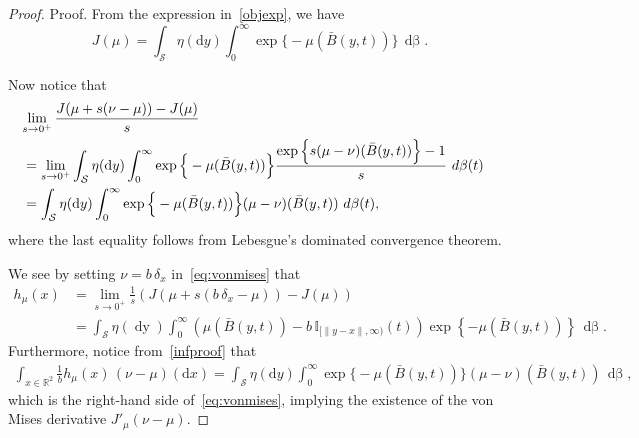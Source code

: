\documentclass[stsy,sglanonrev]{informs4}
\newcommand{\death}{{\beta}}
\begin{document}
\begin{proof}{Proof.}
From the expression in~\eqref{objexp}, we have \begin{equation}\label{objexp2}
    J(\mu) = \int_{\mathcal{S}} \eta(\mbox{d}y) \int_0^\infty \exp\Big\{-\mu(\bar{B}(y,t))\Big\} \, \mathop{d\death(t)}.
\end{equation}

Now notice that
\begin{align}\label{eq:vonmises}
    \lefteqn{\lim_{s \to 0^+} \frac{J(\mu + s(\nu - \mu)) - J(\mu)}{s}} \nonumber \\
    & = \lim_{s \to 0^+} \int_{\mathcal{S}} \eta(\mbox{d}y) \int_0^\infty \exp \Big\{-\mu(\bar{B}(y,t))\Big\} \frac{\exp\Big\{ s(\mu - \nu)(\bar{B}(y,t))\Big\}-1}{s} \, \mathop{d\death(t)} \nonumber \\ 
& = \int_{\mathcal{S}} \eta(\mbox{d}y) \int_0^\infty \exp\Big\{-\mu(\bar{B}(y,t))\Big\} (\mu - \nu)(\bar{B}(y,t)) \, \mathop{d\death(t)},\end{align} where the last equality follows from Lebesgue's dominated convergence theorem. 

We see by setting $\nu = b\,\delta_x$ in~\eqref{eq:vonmises} that
\begin{align} \label{infproof}
h_{\mu}(x) &= \lim_{s \to 0^+} \frac{1}{s} (J(\mu + s(b\,\delta_x - \mu)) - J(\mu)) \nonumber \\
&=  \int_{\mathcal{S}} \eta(\mathop{dy}) \int_0^{\infty} \left(\mu\left(\bar{B}(y,t) \right) - b\,\mathbb{I}_{[\|y-x\|,\infty)}(t)\right) \exp\left\{-\mu\left(\bar{B}(y,t) \right) \right\} \, \mathop{d\death(t)}.
\end{align}
Furthermore, notice from~\eqref{infproof} that
\begin{align} \int_{x \in \mathbb{R}^2} \frac{1}{b}h_{\mu}(x) \, (\nu-\mu)(\mbox{d}x) =  \int_{\mathcal{S}} \eta(\mbox{d}y) \int_0^\infty \exp\Big\{-\mu(\bar{B}(y,t))\Big\} (\mu - \nu)(\bar{B}(y,t)) \, \mathop{d\death(t)},
\end{align}
which is the right-hand side of~\eqref{eq:vonmises}, implying the existence of the von Mises derivative $J'_{\mu}(\nu-\mu)$. 

\hfill \Halmos
\end{proof}
\end{document}
